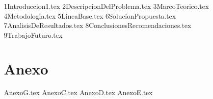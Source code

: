 \documentclass[12pt,letterpaper,oneside]{book}
\newcommand{\capitulo}[1]{{#1.tex}}
\newcommand{\apendice}[1]{{#1.tex}}
\newcommand{\anexo}[1]{{#1.tex}}
\begin{document}
\frontmatter

\clearpage
\thispagestyle{empty}

\clearpage
\thispagestyle{empty}
\tableofcontents
\thispagestyle{empty}
\clearpage

\setcounter{page}{1}
\listoffigures
{}
\clearpage
\listoftables
{}
\clearpage

\mainmatter

\capitulo{1Introduccion1}
\capitulo{2DescripcionDelProblema}
\capitulo{3MarcoTeorico}
\capitulo{4Metodologia}
\capitulo{5LineaBase}
\capitulo{6SolucionPropuesta}
\capitulo{7AnalisisDeResultados}
\capitulo{8ConclusionesRecomendaciones}
\capitulo{9TrabajoFuturo}
\chapter*{Anexo}
\renewcommand{\thesection}{\Alph{section}}
\anexo{AnexoG}
\anexo{AnexoC}
\anexo{AnexoD}
\anexo{AnexoE}
\backmatter


\end{document}
